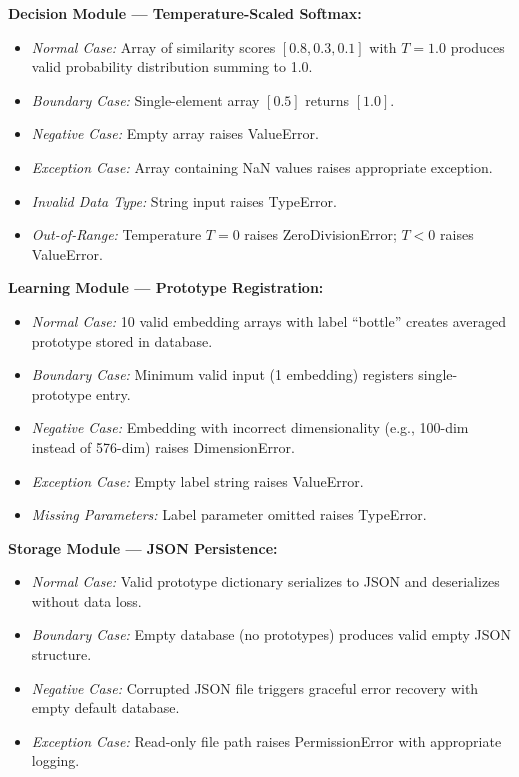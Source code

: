 \documentclass[12pt,a4paper]{report}
\begin{document}
\textbf{Decision Module --- Temperature-Scaled Softmax:}
\begin{itemize}
    \item \textit{Normal Case:} Array of similarity scores $[0.8, 0.3, 0.1]$ with $T=1.0$ produces valid probability distribution summing to 1.0.
    \item \textit{Boundary Case:} Single-element array $[0.5]$ returns $[1.0]$.
    \item \textit{Negative Case:} Empty array raises ValueError.
    \item \textit{Exception Case:} Array containing NaN values raises appropriate exception.
    \item \textit{Invalid Data Type:} String input raises TypeError.
    \item \textit{Out-of-Range:} Temperature $T=0$ raises ZeroDivisionError; $T<0$ raises ValueError.
\end{itemize}

\textbf{Learning Module --- Prototype Registration:}
\begin{itemize}
    \item \textit{Normal Case:} 10 valid embedding arrays with label ``bottle'' creates averaged prototype stored in database.
    \item \textit{Boundary Case:} Minimum valid input (1 embedding) registers single-prototype entry.
    \item \textit{Negative Case:} Embedding with incorrect dimensionality (e.g., 100-dim instead of 576-dim) raises DimensionError.
    \item \textit{Exception Case:} Empty label string raises ValueError.
    \item \textit{Missing Parameters:} Label parameter omitted raises TypeError.
\end{itemize}

\textbf{Storage Module --- JSON Persistence:}
\begin{itemize}
    \item \textit{Normal Case:} Valid prototype dictionary serializes to JSON and deserializes without data loss.
    \item \textit{Boundary Case:} Empty database (no prototypes) produces valid empty JSON structure.
    \item \textit{Negative Case:} Corrupted JSON file triggers graceful error recovery with empty default database.
    \item \textit{Exception Case:} Read-only file path raises PermissionError with appropriate logging.
\end{itemize}
\end{document}
